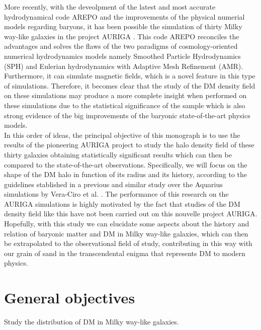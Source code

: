 \documentclass[12pt]{article}
\begin{document}
More recently, with the deveolpment of the latest and most accurate hydrodynamical code AREPO \cite{arepo} and the improvements of the physical numerial models regarding baryons, it has been possible the simulation of thirty Milky way-like galaxies in the project AURIGA \cite{auriga}. This code AREPO reconciles the advantages and solves the flaws of the two paradigms of cosmology-oriented numerical hydrodynamics models namely Smoothed Particle Hydrodynamics (SPH) and Eulerian hydrodynamics with Adaptive Mesh Refinement (AMR). Furthermore, it can simulate magnetic fields, which is a novel feature in this type of simulations. Therefore, it becomes clear that the study of the DM density field on these simulations may produce a more complete insight when performed on these simulations due to the statistical significance of the sample which is also strong evidence of the big improvements of the baryonic state-of-the-art physics models.\\

In this order of ideas, the principal objective of this monograph is to use the results of the pioneering AURIGA project \cite{AURIGA} to study the halo density field of these thirty galaxies obtaining statistically significant results which can then be compared to the state-of-the-art observations. Specifically, we will focus on the shape of the DM halo in function of its radius and its history, according to the guidelines stablished in a previous and similar study over the Aquarius simulations by Vera-Ciro et al. \cite{Vera-Ciro et al 2011}. The performance of this research on the AURIGA simulations is highly motivated by the fact that studies of the DM density field like this have not been carried out on this nouvelle project AURIGA. Hopefully, with this study we can elucidate some aspects about the history and relation of baryonic matter and DM in Milky way-like galaxies, which can then be extrapolated to the observational field of study, contributing in this way with our grain of sand in the transcendental enigma that represents DM to modern physics.\\


\section{General objectives}


Study the distribution of DM in Milky way-like galaxies.
\end{document}
